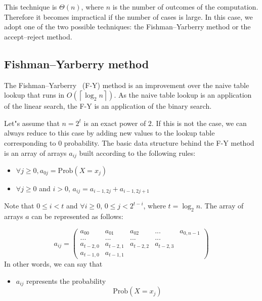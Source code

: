 \documentclass[justified, sixbynine]{tufte-book}
\theoremstyle{plain}%
\newtheorem * {corollary}{Corollary}
\theoremstyle{definition}
\theoremstyle{remark}
\newtheorem * {remark}{Remark}
\newtheorem * {note}{Note}
\begin{document}
\begin{fullwidth}
This technique is $\Theta (n)$, where $n$ is the number of outcomes of the
computation. Therefore it becomes impractical if the number of cases is
large. In this case, we adopt one of the two possible techniques: the
Fishman--Yarberry method or the accept--reject method.

\goodbreak\subsection{Fishman--Yarberry method}

The Fishman--Yarberry~\cite{fishman}  (F-Y) method is an improvement over the naive table
lookup that runs in $O(\left\lceil \log _2n\right\rceil )$. As the naive
table lookup is an application of the linear search, the F-Y is an
application of the binary search.

Let"s assume that $n=2^t$ is an exact power of $2$. If this is not the case, 
we can always reduce to this case by adding new values to the lookup table
corresponding to $0$ probability. The basic data structure behind the F-Y
method is an array of arrays $a_{ij}$ built according to the following rules:

\begin{itemize}
\item  $\forall j\geq 0, a_{0j}=\textrm{Prob}(X=x_j)$

\item  $\forall j\geq 0$ and $i>0$, $a_{ij}=a_{i-1, 2j}+a_{i-1, 2j+1}$
\end{itemize}

Note that $0\leq i<t$ and $\forall i\geq 0$, $0\leq j<2^{t-i}$, where $t=\log
_2n$. The array of arrays $a$ can be represented as follows:

\begin{equation}
a_{ij}=\left(
\begin{array}{lllll}
a_{00} & a_{01} & a_{02} & ... & a_{0, n-1} \\
... & ... & ... & ... &  \\
a_{t-2, 0} & a_{t-2, 1} & a_{t-2, 2} & a_{t-2, 3} &  \\
a_{t-1, 0} & a_{t-1, 1} &  &  &
\end{array}
\right)
\end{equation}
In other words, we can say that

\begin{itemize}
\item  $a_{ij}$ represents the probability
\begin{equation}
\textrm{Prob}(X=x_j)
\end{equation}


\end{itemize}
\end{fullwidth}
\end{document}
